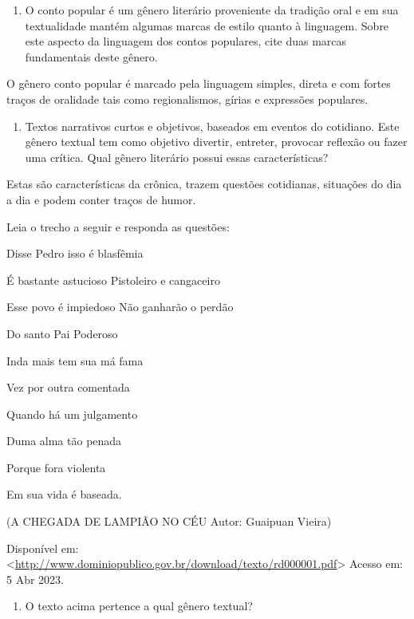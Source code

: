 {

\begin{enumerate}
\def\labelenumi{\arabic{enumi})}
\tightlist
\item
  O conto popular é um gênero literário proveniente da tradição oral e
  em sua textualidade mantém algumas marcas de estilo quanto à
  linguagem. Sobre este aspecto da linguagem dos contos populares, cite
  duas marcas fundamentais deste gênero.
\end{enumerate}

O gênero conto popular é marcado pela linguagem simples, direta e com
fortes traços de oralidade tais como regionalismos, gírias e expressões
populares.

\begin{enumerate}
\def\labelenumi{\arabic{enumi})}
\setcounter{enumi}{1}
\tightlist
\item
  Textos narrativos curtos e objetivos, baseados em eventos do
  cotidiano. Este gênero textual tem como objetivo divertir, entreter,
  provocar reflexão ou fazer uma crítica. Qual gênero literário possui
  essas características?
\end{enumerate}

Estas são características da crônica, trazem questões cotidianas,
situações do dia a dia e podem conter traços de humor.

Leia o trecho a seguir e responda as questões:

Disse Pedro isso é blasfêmia

É bastante astucioso Pistoleiro e cangaceiro

Esse povo é impiedoso Não ganharão o perdão

Do santo Pai Poderoso

Inda mais tem sua má fama

Vez por outra comentada

Quando há um julgamento

Duma alma tão penada

Porque fora violenta

Em sua vida é baseada.

(A CHEGADA DE LAMPIÃO NO CÉU Autor: Guaipuan Vieira)

Disponível em:
\textless{}\href{http://www.dominiopublico.gov.br/download/texto/rd000001.pdf}{\uline{http://www.dominiopublico.gov.br/download/texto/rd000001.pdf}}\textgreater{}
Acesso em: 5 Abr 2023.

\begin{enumerate}
\def\labelenumi{\arabic{enumi})}
\setcounter{enumi}{2}
\tightlist
\item
  O texto acima pertence a qual gênero textual?
\end{enumerate}

}
